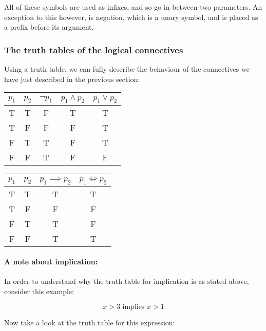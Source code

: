 
All of these symbols are used as infixes, and so go in between two parameters.
An exception to this however, is negation, which is a unary symbol, and is
placed as a prefix before its argument.


\subsubsection{The truth tables of the logical connectives}

Using a truth table, we can fully describe the behaviour of the connectives we
have just described in the previous section:

\begin{center}
	\begin{tabular}{|c|c|c|c|c|}
		\hline
		$p_1$& $p_2$& $\neg p_1$& $p_1 \wedge p_2$& $p_1 \vee p_2$\\ \hline
		T& T& F& T &T\\
		T& F& F& F &T\\
		F& T& T& F &T\\
		F& F& T& F &F\\ \hline
	\end{tabular}
	\begin{tabular}{|c|c|c|c|}
		\hline
		$p_1$& $p_2$& $p_1 \implies p_2$& $p_1 \iff p_2$\\ \hline
		T& T& T &T\\
		T& F& F &F\\
		F& T& T &F\\
		F& F& T &T\\ \hline
	\end{tabular}
\end{center}

\paragraph{A note about implication:}
In order to understand why the truth table for implication is as stated above,
consider this example:

\begin{dmath*}
	{x > 3 \textrm{ implies } x > 1}
\end{dmath*}

Now take a look at the truth table for this expression:

